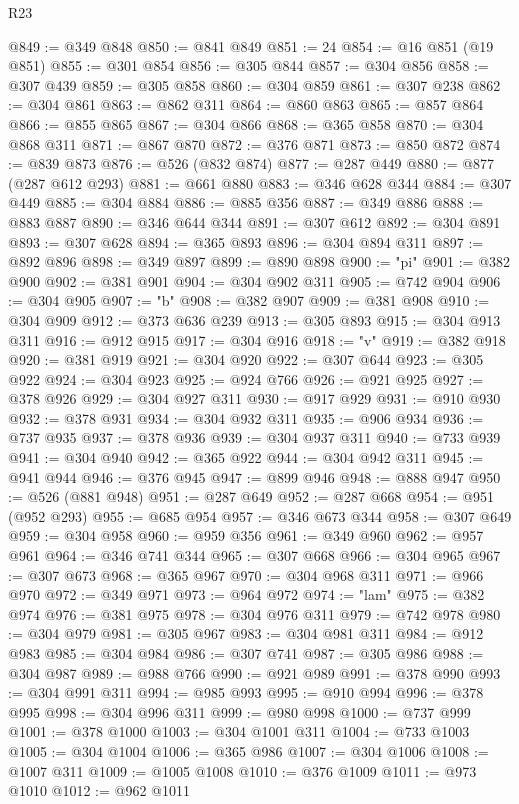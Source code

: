 \begin{lexlean}{R23}
\begin{coremodule}
@849 := @349 @848
@850 := @841 @849
@851 := 24
@854 := @16 @851 (@19 @851)
@855 := @301 @854
@856 := @305 @844
@857 := @304 @856
@858 := @307 @439
@859 := @305 @858
@860 := @304 @859
@861 := @307 @238
@862 := @304 @861
@863 := @862 @311
@864 := @860 @863
@865 := @857 @864
@866 := @855 @865
@867 := @304 @866
@868 := @365 @858
@870 := @304 @868 @311
@871 := @867 @870
@872 := @376 @871
@873 := @850 @872
@874 := @839 @873
@876 := @526 (@832 @874)
@877 := @287 @449
@880 := @877 (@287 @612 @293)
@881 := @661 @880
@883 := @346 @628 @344
@884 := @307 @449
@885 := @304 @884
@886 := @885 @356
@887 := @349 @886
@888 := @883 @887
@890 := @346 @644 @344
@891 := @307 @612
@892 := @304 @891
@893 := @307 @628
@894 := @365 @893
@896 := @304 @894 @311
@897 := @892 @896
@898 := @349 @897
@899 := @890 @898
@900 := "pi"
@901 := @382 @900
@902 := @381 @901
@904 := @304 @902 @311
@905 := @742 @904
@906 := @304 @905
@907 := "b"
@908 := @382 @907
@909 := @381 @908
@910 := @304 @909
@912 := @373 @636 @239
@913 := @305 @893
@915 := @304 @913 @311
@916 := @912 @915
@917 := @304 @916
@918 := "v"
@919 := @382 @918
@920 := @381 @919
@921 := @304 @920
@922 := @307 @644
@923 := @305 @922
@924 := @304 @923
@925 := @924 @766
@926 := @921 @925
@927 := @378 @926
@929 := @304 @927 @311
@930 := @917 @929
@931 := @910 @930
@932 := @378 @931
@934 := @304 @932 @311
@935 := @906 @934
@936 := @737 @935
@937 := @378 @936
@939 := @304 @937 @311
@940 := @733 @939
@941 := @304 @940
@942 := @365 @922
@944 := @304 @942 @311
@945 := @941 @944
@946 := @376 @945
@947 := @899 @946
@948 := @888 @947
@950 := @526 (@881 @948)
@951 := @287 @649
@952 := @287 @668
@954 := @951 (@952 @293)
@955 := @685 @954
@957 := @346 @673 @344
@958 := @307 @649
@959 := @304 @958
@960 := @959 @356
@961 := @349 @960
@962 := @957 @961
@964 := @346 @741 @344
@965 := @307 @668
@966 := @304 @965
@967 := @307 @673
@968 := @365 @967
@970 := @304 @968 @311
@971 := @966 @970
@972 := @349 @971
@973 := @964 @972
@974 := "lam"
@975 := @382 @974
@976 := @381 @975
@978 := @304 @976 @311
@979 := @742 @978
@980 := @304 @979
@981 := @305 @967
@983 := @304 @981 @311
@984 := @912 @983
@985 := @304 @984
@986 := @307 @741
@987 := @305 @986
@988 := @304 @987
@989 := @988 @766
@990 := @921 @989
@991 := @378 @990
@993 := @304 @991 @311
@994 := @985 @993
@995 := @910 @994
@996 := @378 @995
@998 := @304 @996 @311
@999 := @980 @998
@1000 := @737 @999
@1001 := @378 @1000
@1003 := @304 @1001 @311
@1004 := @733 @1003
@1005 := @304 @1004
@1006 := @365 @986
@1007 := @304 @1006
@1008 := @1007 @311
@1009 := @1005 @1008
@1010 := @376 @1009
@1011 := @973 @1010
@1012 := @962 @1011

\end{coremodule}
\end{lexlean}
